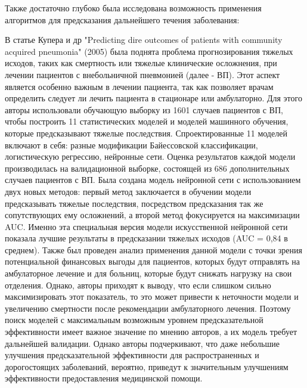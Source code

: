 \documentclass[14pt, a4paper]{extarticle}
\begin{document}
Также достаточно глубоко была исследована возможность применения алгоритмов для предсказания дальнейшего течения заболевания:


В статье Купера и др "Predicting
dire outcomes of patients with community acquired pneumonia" (2005) \cite{cooper2005predicting} была поднята проблема прогнозирования тяжелых исходов, таких как смертность или тяжелые клинические осложнения, при лечении пациентов с внебольничной пневмонией (далее - ВП). Этот аспект является особенно важным в лечении пациента, так как позволяет врачам определить следует ли лечить пациента в стационаре или амбулаторно. Для этого авторы использовали обучающую выборку из 1601 случаев пациентов с ВП, чтобы построить 11 статистических моделей и моделей машинного обучения, которые предсказывают тяжелые последствия. Спроектированные 11 моделей включают в себя: разные модификации Байессовской классификации, логистическую регрессию, нейронные сети. Оценка результатов каждой модели производилась на валидационной выборке, состоящей из  686 дополнительных случаев пациентов с ВП. 
Была создана модель нейронной сети с использованием двух новых методов: первый метод заключается в обучении модели предсказывать тяжелые последствия, посредством предсказания так же сопутствующих ему осложнений, а второй метод фокусируется на максимизации  AUC. Именно эта специальная версия модели искусственной нейронной сети  
 показала лучшие результаты  в предсказании тяжелых исходов (AUC = 0,84 в среднем). Также был проведен анализ применения данной модели с точки зрения потенциальной финансовых выгоды для пациентов, которых будут отправлять на амбулаторное лечение и для больниц, которые будут снижать нагрузку на свои отделения. Однако, авторы приходят к выводу, что если слишком сильно максимизировать этот показатель, то это может привести к неточности модели и увеличению смертности после рекомендации амбулаторного лечения. Поэтому поиск моделей с максимальным возможным уровнем предсказательной эффективности имеет важное значение по мнению авторов, а их модель требует дальнейшей валидации. Однако авторы подчеркивают, что даже небольшие улучшения предсказательной эффективности для распространенных и дорогостоящих заболеваний, вероятно, приведут к значительным улучшениям  эффективности предоставления медицинской помощи.
 
\end{document}
